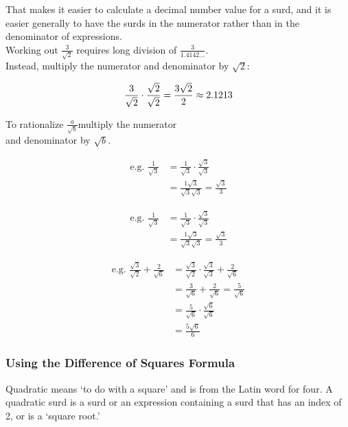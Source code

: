 \documentclass{article}
\begin{document}
That makes it easier to calculate a decimal number value for a surd, and it is easier generally to have the surds in the numerator rather than in the denominator of expressions.\\

Working out $\frac{3}{\sqrt{2}}$ requires long division of $\frac{3}{1.4142\ldots}$.\\

Instead, multiply the numerator and denominator by $\sqrt{2}$:

$$\frac{3}{\sqrt{2}}\cdot
\frac{\sqrt{2}}{\sqrt{2}}
=\frac{3\sqrt{2}}{2}\\
\approx2.1213$$

\newpage

To rationalize \Large$\frac{a}{\sqrt{b}}$\normalsize multiply the numerator\\ and denominator by $\sqrt{b}$.

\begin{align*}
\text{e.g. }
\frac{1}{\sqrt{3}}
&=\frac{1}{\sqrt{3}}\cdot \frac{\sqrt{3}}{\sqrt{3}}\\
&=\frac{1\sqrt{3}}{\sqrt{3}\sqrt{3}}=\frac{\sqrt{3}}{3}
\end{align*}

\begin{align*}
\text{e.g. }
\frac{1}{\sqrt{3}}
&=\frac{1}{\sqrt{3}}\cdot\frac{\sqrt{3}}{\sqrt{3}}\\
&=\frac{1\sqrt{3}}{\sqrt{3}\sqrt{3}}=\frac{\sqrt{3}}{3}
\end{align*}

\begin{align*}
\text{e.g. }
\frac{\sqrt{3}}{\sqrt{2}}+\frac{2}{\sqrt{6}}
&=\frac{\sqrt{3}}{\sqrt{2}}\cdot
\frac{\sqrt{3}}{\sqrt{3}}
+\frac{2}{\sqrt{6}}\\
&=\frac{3}{\sqrt{6}}+\frac{2}{\sqrt{6}}
=\frac{5}{\sqrt{6}}\\
&=\frac{5}{\sqrt{6}}\cdot\frac{\sqrt{6}}{\sqrt{6}}\\
&=\frac{5\sqrt{6}}{6}
\end{align*}

\newpage

\subsubsection*{Using the Difference of Squares Formula}

Quadratic means ‘to do with a square’ and is from the Latin word for four. A quadratic surd is a surd or an expression containing a surd that has an index of 2, or is a ‘square root.’\\
\end{document}
